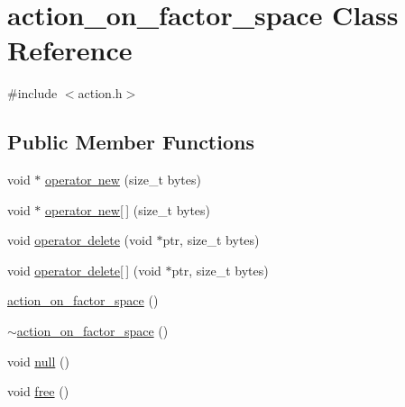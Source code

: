 \hypertarget{classaction__on__factor__space}{}\section{action\+\_\+on\+\_\+factor\+\_\+space Class Reference}
\label{classaction__on__factor__space}


{\ttfamily \#include $<$action.\+h$>$}

\subsection*{Public Member Functions}
\begin{DoxyCompactItemize}
\item 
void $\ast$ \mbox{\hyperlink{classaction__on__factor__space_ab56907f2dd84d529e3970b0e82ea702f}{operator new}} (size\+\_\+t bytes)
\item 
void $\ast$ \mbox{\hyperlink{classaction__on__factor__space_a575c049712f3ed871aef8b68455daed8}{operator new\mbox{[}$\,$\mbox{]}}} (size\+\_\+t bytes)
\item 
void \mbox{\hyperlink{classaction__on__factor__space_ac4f92977437f901e56ff2065aa70d4e2}{operator delete}} (void $\ast$ptr, size\+\_\+t bytes)
\item 
void \mbox{\hyperlink{classaction__on__factor__space_a401516c33fc8f24dda6315f556680bae}{operator delete\mbox{[}$\,$\mbox{]}}} (void $\ast$ptr, size\+\_\+t bytes)
\item 
\mbox{\hyperlink{classaction__on__factor__space_a06a81cc35c35d6c0a6696cdf56c20950}{action\+\_\+on\+\_\+factor\+\_\+space}} ()
\item 
\mbox{\hyperlink{classaction__on__factor__space_ab58dacaec0fa636baef32d524fa5fa55}{$\sim$action\+\_\+on\+\_\+factor\+\_\+space}} ()
\item 
void \mbox{\hyperlink{classaction__on__factor__space_ae035ff0be77d183b88c99886de965038}{null}} ()
\item 
void \mbox{\hyperlink{classaction__on__factor__space_a351511c66274e76321fc114c765cfdc2}{free}} ()
\item 

\end{DoxyCompactItemize}
